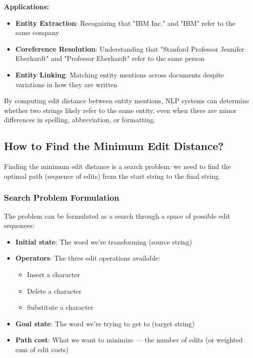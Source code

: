 \documentclass[11pt,a4paper]{article}
\theoremstyle{definition}
\theoremstyle{plain}
\theoremstyle{remark}
\begin{document}
\textbf{Applications:}
\begin{itemize}
    \item \textbf{Entity Extraction}: Recognizing that "IBM Inc." and "IBM" refer to the same company
    \item \textbf{Coreference Resolution}: Understanding that "Stanford Professor Jennifer Eberhardt" and "Professor Eberhardt" refer to the same person
    \item \textbf{Entity Linking}: Matching entity mentions across documents despite variations in how they are written
\end{itemize}

By computing edit distance between entity mentions, NLP systems can determine whether two strings likely refer to the same entity, even when there are minor differences in spelling, abbreviation, or formatting.

\subsection{How to Find the Minimum Edit Distance?}

Finding the minimum edit distance is a search problem: we need to find the optimal path (sequence of edits) from the start string to the final string.

\subsubsection{Search Problem Formulation}

\begin{tcolorbox}[colback=purple!5!white,colframe=purple!75!black,title=\textbf{Edit Distance as Search Problem}]
The problem can be formulated as a search through a space of possible edit sequences:
\begin{itemize}
    \item \textbf{Initial state}: The word we're transforming (source string)
    \item \textbf{Operators}: The three edit operations available:
    \begin{itemize}
        \item Insert a character
        \item Delete a character
        \item Substitute a character
    \end{itemize}
    \item \textbf{Goal state}: The word we're trying to get to (target string)
    \item \textbf{Path cost}: What we want to minimize — the number of edits (or weighted sum of edit costs)
\end{itemize}
\end{tcolorbox}
\end{document}
